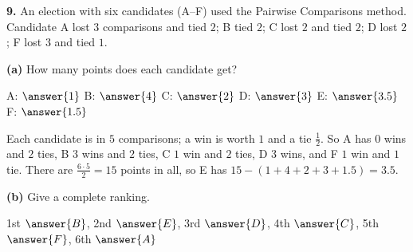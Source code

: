 \documentclass[12pt]{ximera}
\begin{document}
\begin{problem}
\textbf{9.} An election with six candidates (A--F) used the Pairwise Comparisons method.
Candidate A lost $3$ comparisons and tied $2$; B tied $2$; C lost $2$ and tied $2$; D lost
$2$; F lost $3$ and tied $1$.

\begin{prompt}
\textbf{(a)} How many points does each candidate get?

A: $\answer{1}$ \quad B: $\answer{4}$ \quad C: $\answer{2}$ \quad D: $\answer{3}$ \quad
E: $\answer{3.5}$ \quad F: $\answer{1.5}$

\begin{feedback}
Each candidate is in $5$ comparisons; a win is worth $1$ and a tie $\frac12$. So A has
$0$ wins and $2$ ties, B $3$ wins and $2$ ties, C $1$ win and $2$ ties, D $3$ wins, and
F $1$ win and $1$ tie. There are $\frac{6\cdot5}2=15$ points in all, so E has
$15-(1+4+2+3+1.5)=3.5$.
\end{feedback}
\end{prompt}

\begin{prompt}
\textbf{(b)} Give a complete ranking.

1st $\answer{B}$, 2nd $\answer{E}$, 3rd $\answer{D}$, 4th $\answer{C}$, 5th $\answer{F}$,
6th $\answer{A}$
\end{prompt}
\end{problem}
\end{document}
